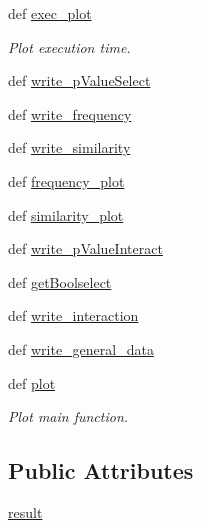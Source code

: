 \begin{DoxyCompactItemize}
def \hyperlink{classirna_1_1iRNA__stat_1_1Draw__data_1_1draw__data_af8b81042e349a7cc4813fa5aa139fd9b}{exec\-\_\-plot}
\begin{DoxyCompactList}\small\item\em \-Plot execution time. \end{DoxyCompactList}\item 
def \hyperlink{classirna_1_1iRNA__stat_1_1Draw__data_1_1draw__data_aedcd062a852bce23f00c97b589c3b603}{write\-\_\-p\-Value\-Select}
\item 
def \hyperlink{classirna_1_1iRNA__stat_1_1Draw__data_1_1draw__data_a47d4346f5b2ad3708903ee83689314d8}{write\-\_\-frequency}
\item 
def \hyperlink{classirna_1_1iRNA__stat_1_1Draw__data_1_1draw__data_a4a7f9c666a981fac1cf8b0fbd70b66b2}{write\-\_\-similarity}
\item 
def \hyperlink{classirna_1_1iRNA__stat_1_1Draw__data_1_1draw__data_a70a6a95402bb5b496c69b5e7ddf4004e}{frequency\-\_\-plot}
\item 
def \hyperlink{classirna_1_1iRNA__stat_1_1Draw__data_1_1draw__data_a3328ba53e5230d9692fd2461df7ee8aa}{similarity\-\_\-plot}
\item 
def \hyperlink{classirna_1_1iRNA__stat_1_1Draw__data_1_1draw__data_a2aa60523fe524eb724d9f401583cd807}{write\-\_\-p\-Value\-Interact}
\item 
def \hyperlink{classirna_1_1iRNA__stat_1_1Draw__data_1_1draw__data_ac43bb6f1c4fd06b6c51ff3271c9bd008}{get\-Boolselect}
\item 
def \hyperlink{classirna_1_1iRNA__stat_1_1Draw__data_1_1draw__data_a5b07a56ee82dc3b1298e0cdcc7108f7f}{write\-\_\-interaction}
\item 
def \hyperlink{classirna_1_1iRNA__stat_1_1Draw__data_1_1draw__data_a530d8cfb232f5ad4298ede22cbf116f6}{write\-\_\-general\-\_\-data}
\item 
def \hyperlink{classirna_1_1iRNA__stat_1_1Draw__data_1_1draw__data_a57c1ac80b7ebf7b0f7dc7e81da0484a3}{plot}
\begin{DoxyCompactList}\small\item\em \-Plot main function. \end{DoxyCompactList}\end{DoxyCompactItemize}
\subsection*{\-Public \-Attributes}
\begin{DoxyCompactItemize}
\item 
\hyperlink{classirna_1_1iRNA__stat_1_1Draw__data_1_1draw__data_a2bb38ed8ac653cc6c55c0edab3ec7be4}{result}
\end{DoxyCompactItemize}


